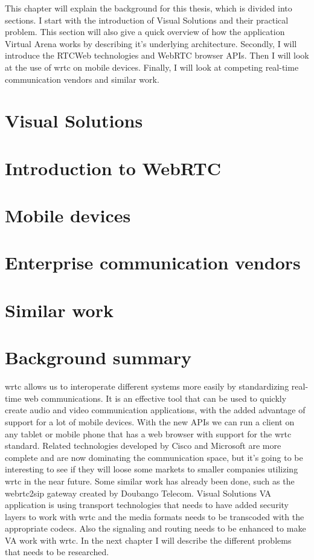 
This chapter will explain the background for this thesis, which is divided into sections. I start with the introduction of Visual Solutions and their practical problem. This section will also give a quick overview of how the application Virtual Arena works by describing it's underlying architecture. Secondly, I will introduce the RTCWeb technologies and WebRTC browser APIs. Then I will look at the use of \gls{wrtc} on mobile devices. Finally, I will look at competing real-time communication vendors and similar work.

\section{Visual Solutions}


\newpage
\section{Introduction to WebRTC}


\newpage
\section{Mobile devices}


\newpage
\section{Enterprise communication vendors}


\newpage
\section{Similar work}


\newpage
\section{Background summary}
\gls{wrtc} allows us to interoperate different systems more easily by standardizing real-time web communications. It is an effective tool that can be used to quickly create audio and video communication applications, with the added advantage of support for a lot of mobile devices. With the new APIs we can run a client on any tablet or mobile phone that has a web browser with support for the \gls{wrtc} standard. Related technologies developed by Cisco and Microsoft are more complete and are now dominating the communication space, but it's going to be interesting to see if they will loose some markets to smaller companies utilizing \gls{wrtc} in the near future. Some similar work has already been done, such as the webrtc2sip gateway created by Doubango Telecom. Visual Solutions VA application is using transport technologies that needs to have added security layers to work with \gls{wrtc} and the media formats needs to be transcoded with the appropriate codecs. Also the signaling and routing needs to be enhanced to make VA work with \gls{wrtc}. In the next chapter I will describe the different problems that needs to be researched.

